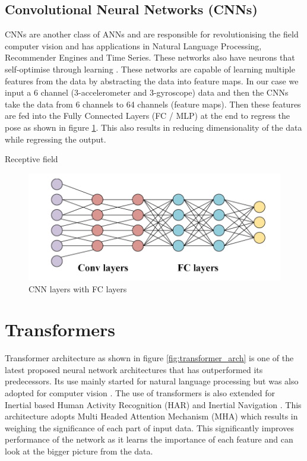 \subsection{Convolutional Neural Networks (CNNs)}
CNNs are another class of ANNs and are responsible for revolutionising the field computer vision and has applications in Natural Language Processing, Recommender Engines and Time Series. These networks also have neurons that self-optimise through learning \citep{cnn2015introduction}. These networks are capable of learning multiple features from the data by abstracting the data into feature maps. In our case we input a 6 channel (3-accelerometer and 3-gyroscope) data and then the CNNs take the data from 6 channels to 64 channels (feature maps). Then these features are fed into the Fully Connected Layers (FC / MLP) at the end to regress the pose as shown in figure \ref{fig:cnn_fc}. This also results in reducing dimensionality of the data while regressing the output. 

Receptive field

\begin{figure}
    \centering
    \includegraphics[scale=0.4]{images/fig_chapter2/nns/cnn_mlp.png}
    \caption{CNN layers with FC layers}
    \label{fig:cnn_fc}
\end{figure}

\section{Transformers}
Transformer architecture as shown in figure \ref{fig:transformer_arch} is one of the latest proposed neural network architectures that has outperformed its predecessors. Its use mainly started for natural language processing \citep{vaswani2017attention} but was also adopted for computer vision \citep{dosovitskiy2020image}. The use of transformers is also extended for Inertial based Human Activity Recognition (HAR) \cite{shavit2021boosting} and Inertial Navigation \citep{rao2022ctin}. This architecture adopts Multi Headed Attention Mechanism (MHA) \citep{vaswani2017attention} which results in weighing the significance of each part of input data. This significantly improves performance of the network as it learns the importance of each feature and can look at the bigger picture from the data.


